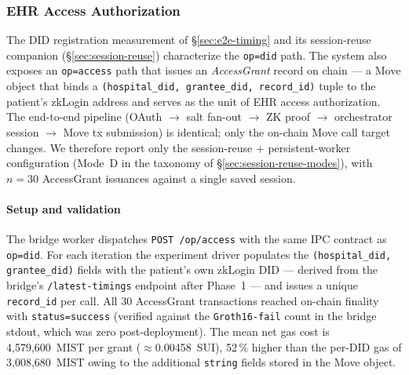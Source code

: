 %
%

\subsubsection{EHR Access Authorization}
\label{sec:ehr-access}

The DID registration measurement of \S\ref{sec:e2e-timing} and its
session-reuse companion (\S\ref{sec:session-reuse}) characterize the
\texttt{op=did} path. The system also exposes an
\texttt{op=access} path that issues an \emph{AccessGrant} record on
chain — a Move object that binds a \texttt{(hospital\_did,
grantee\_did, record\_id)} tuple to the patient's zkLogin address and
serves as the unit of EHR access authorization. The end-to-end
pipeline (OAuth $\to$ salt fan-out $\to$ ZK proof $\to$ orchestrator
session $\to$ Move tx submission) is identical; only the on-chain
Move call target changes. We therefore report only the
session-reuse + persistent-worker configuration (Mode~D in the
taxonomy of \S\ref{sec:session-reuse-modes}), with $n = 30$ AccessGrant
issuances against a single saved session.

\paragraph{Setup and validation}

The bridge worker dispatches \texttt{POST /op/access} with the same IPC
contract as \texttt{op=did}. For each iteration the experiment driver
populates the \texttt{(hospital\_did, grantee\_did)} fields with the
patient's own zkLogin DID — derived from the bridge's
\texttt{/latest-timings} endpoint after Phase~1 — and issues a unique
\texttt{record\_id} per call. All 30 AccessGrant transactions reached
on-chain finality with \texttt{status=success} (verified against the
\texttt{Groth16-fail} count in the bridge stdout, which was zero
post-deployment). The mean net gas cost is 4{,}579{,}600~MIST per
grant ($\approx$0.00458~SUI), 52\,\% higher than the per-DID gas of
3{,}008{,}680~MIST owing to the additional \texttt{string} fields
stored in the Move object.


